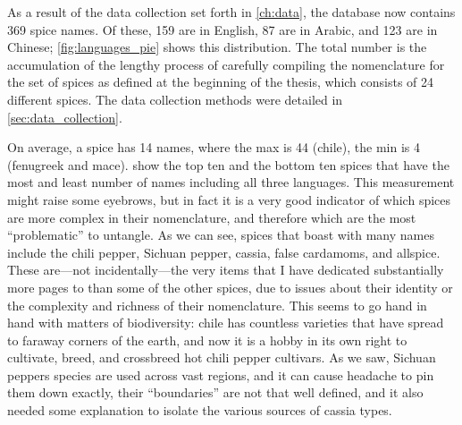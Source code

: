 As a result of the data collection set forth in \cref{ch:data}, the database now contains 369 spice names. Of these, 159 are in English, 87 are in Arabic, and 123 are in Chinese; \cref{fig:languages_pie} shows this distribution.
The total number is the accumulation of the lengthy process of carefully compiling the nomenclature for the set of spices as defined at the beginning of the thesis, which consists of 24 different spices. The data collection methods were detailed in \cref{sec:data_collection}. 

On average, a spice has 14 names, where the max is 44 (chile), the min is 4 (fenugreek and mace).  show the top ten and the bottom ten spices that have the most and least number of names including all three languages. This measurement might raise some eyebrows, but in fact it is a very good indicator of which spices are more complex in their nomenclature, and therefore which are the most ``problematic'' to untangle. As we can see, spices that boast with many names include the chili pepper, Sichuan pepper, cassia, false cardamoms, and allspice. These are---not incidentally---the very items that I have dedicated substantially more pages to than some of the other spices, due to issues about their identity or the complexity and richness of their nomenclature. This seems to go hand in hand with matters of biodiversity: chile has countless varieties that have spread to faraway corners of the earth, and now it is a hobby in its own right to cultivate, breed, and crossbreed hot chili pepper cultivars. As we saw, Sichuan peppers species are used across vast regions, and it can cause headache to pin them down exactly, their ``boundaries'' are not that well defined, and it also needed some explanation to isolate the various sources of cassia types.

